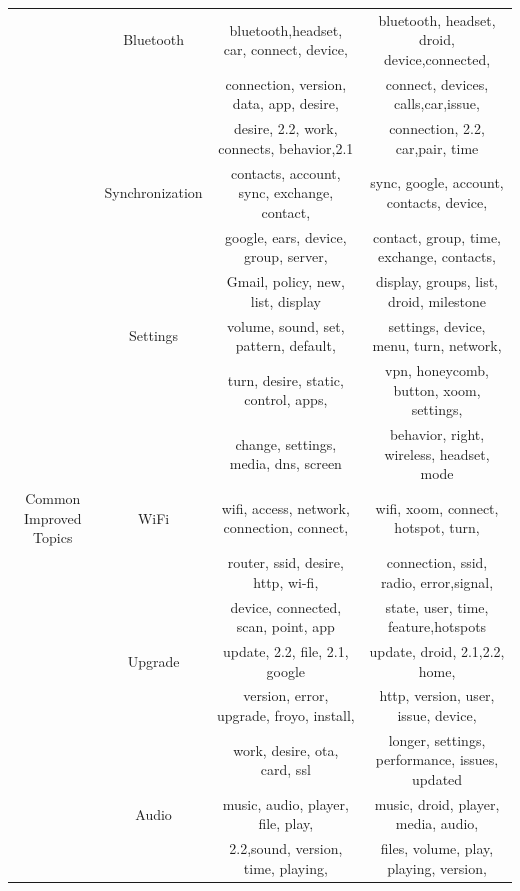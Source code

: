 \documentclass[10pt, conference, compsocconf]{IEEEtran}
\begin{document}
\begin{table}[!htb]
\begin{tabular}{|c||c||c||c|}
& Bluetooth & bluetooth,headset, car, connect, device,  &bluetooth,	headset, droid, device,connected, \\
 &&connection, version, data, app, desire, & connect, devices, calls,car,issue,	\\
&&desire,	2.2, work, connects, behavior,2.1 & connection, 2.2, car,pair, time\\ \cline{2-4}
            
  & Synchronization&contacts, account, sync, exchange, contact, &sync, google, account, contacts, device, \\
&&google, ears, device, group, server, &contact, group, time, exchange, contacts, \\
&&Gmail, policy, new, list, display&display, groups,  list,  droid, milestone\\ \cline{2-4}
            
  & Settings&volume, sound,	set, pattern,  default,&settings, device, menu, turn,	network, \\
 && turn, desire, static, control, apps,&vpn, honeycomb, button, xoom,  settings, \\
  && change, settings, media, dns, screen &behavior,	right, wireless, headset, mode\\
\hline

Common Improved Topics 
&WiFi & wifi, access, network, connection, connect, &wifi, xoom, connect, hotspot, turn, \\
&&router, ssid, desire, http, wi-fi,&connection, ssid, radio, error,signal, \\

&&device, connected, scan, point, app &state, user, time, feature,hotspots\\ \cline{2-4}

&Upgrade & update, 2.2, file, 2.1, google  & update, droid, 2.1,2.2, home, \\

 &&version, error, upgrade, froyo, install, & http, version, user, issue, device,\\           
 
 &&work, desire, ota, card, ssl & longer, settings, performance, issues, updated\\            \cline{2-4}
          
&Audio& music, audio, player, file, play, &music, droid, player, media, audio,  \\

&&2.2,sound, version, time, playing, & files, volume, play, playing, version,\\


\end{tabular}
\end{table}
\end{document}
